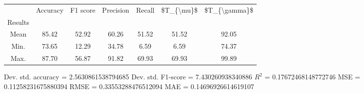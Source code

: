 \begin{tabular}{|c|c|c|c|c|c|c|}
\toprule
{} &  Accuracy &  F1 score &  Precision &  Recall &  \$T\_\{\textbackslash mu\}\$ &  \$T\_\{\textbackslash gamma\}\$ \\
Results &           &           &            &         &            &               \\
\hline
Mean    &     85.42 &     52.92 &      60.26 &   51.52 &      51.52 &         92.05 \\
Min.    &     73.65 &     12.29 &      34.78 &    6.59 &       6.59 &         74.37 \\
Max.    &     87.70 &     56.87 &      91.82 &   69.93 &      69.93 &         99.89 \\
\bottomrule
\end{tabular}

 Dev. std. accuracy = 2.5630861538794685
 Dev. std. F1-score = 7.430260938340886
 $R^2$ = 0.17672468148772746
 MSE = 0.11258231675880394
 RMSE = 0.33553288476512094
 MAE = 0.14696926614619107